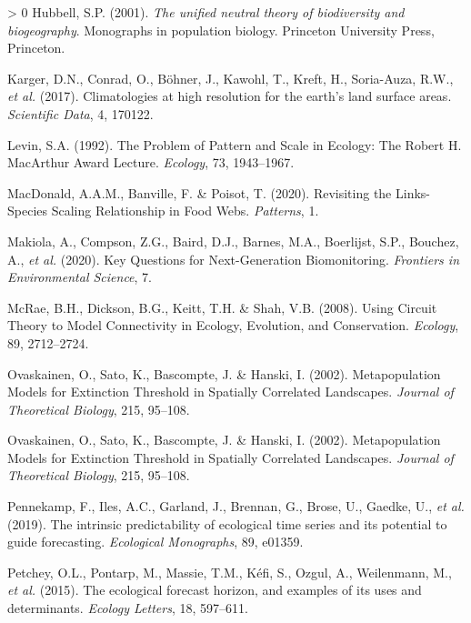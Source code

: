 \documentclass[10pt,oneside]{article}
\newlength{\cslhangindent}
\newenvironment{CSLReferences}[3] %
 {%
  \setlength{\parindent}{0pt}
  \ifodd #1 \everypar{\setlength{\hangindent}{\cslhangindent}}\ignorespaces\fi
  \ifnum #2 > 0
  \setlength{\parskip}{#2\baselineskip}
  \fi
 }%
 {}
\begin{document}
\begin{CSLReferences}{1}{0}
\leavevmode\hypertarget{ref-Hubbell2001UniNeu}{}%
Hubbell, S.P. (2001). \emph{The unified neutral theory of biodiversity
and biogeography}. Monographs in population biology. Princeton
University Press, Princeton.

\leavevmode\hypertarget{ref-Karger2017CliHig}{}%
Karger, D.N., Conrad, O., Böhner, J., Kawohl, T., Kreft, H., Soria-Auza,
R.W., \emph{et al.} (2017). Climatologies at high resolution for the
earth's land surface areas. \emph{Scientific Data}, 4, 170122.

\leavevmode\hypertarget{ref-Levin1992ProPat}{}%
Levin, S.A. (1992). The Problem of Pattern and Scale in Ecology: The
Robert H. MacArthur Award Lecture. \emph{Ecology}, 73, 1943--1967.

\leavevmode\hypertarget{ref-MacDonald2020RevLin}{}%
MacDonald, A.A.M., Banville, F. \& Poisot, T. (2020). Revisiting the
Links-Species Scaling Relationship in Food Webs. \emph{Patterns}, 1.

\leavevmode\hypertarget{ref-Makiola2020KeyQue}{}%
Makiola, A., Compson, Z.G., Baird, D.J., Barnes, M.A., Boerlijst, S.P.,
Bouchez, A., \emph{et al.} (2020). Key Questions for Next-Generation
Biomonitoring. \emph{Frontiers in Environmental Science}, 7.

\leavevmode\hypertarget{ref-McRae2008UsiCir}{}%
McRae, B.H., Dickson, B.G., Keitt, T.H. \& Shah, V.B. (2008). Using
Circuit Theory to Model Connectivity in Ecology, Evolution, and
Conservation. \emph{Ecology}, 89, 2712--2724.

\leavevmode\hypertarget{ref-Ovaskainen2002MetMod}{}%
Ovaskainen, O., Sato, K., Bascompte, J. \& Hanski, I. (2002).
Metapopulation Models for Extinction Threshold in Spatially Correlated
Landscapes. \emph{Journal of Theoretical Biology}, 215, 95--108.

\leavevmode\hypertarget{ref-Ovaskainen2002MetMod}{}%
Ovaskainen, O., Sato, K., Bascompte, J. \& Hanski, I. (2002).
Metapopulation Models for Extinction Threshold in Spatially Correlated
Landscapes. \emph{Journal of Theoretical Biology}, 215, 95--108.

\leavevmode\hypertarget{ref-Pennekamp2019IntPre}{}%
Pennekamp, F., Iles, A.C., Garland, J., Brennan, G., Brose, U., Gaedke,
U., \emph{et al.} (2019). The intrinsic predictability of ecological
time series and its potential to guide forecasting. \emph{Ecological
Monographs}, 89, e01359.

\leavevmode\hypertarget{ref-Petchey2015EcoFor}{}%
Petchey, O.L., Pontarp, M., Massie, T.M., Kéfi, S., Ozgul, A.,
Weilenmann, M., \emph{et al.} (2015). The ecological forecast horizon,
and examples of its uses and determinants. \emph{Ecology Letters}, 18,
597--611.


\end{CSLReferences}
\end{document}

